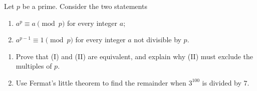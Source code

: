 Let $p$ be a prime. Consider the two statements
\begin{enumerate}
\item[(I)] $a^p\equiv a\pmod p$ for every integer $a$;
\item[(II)] $a^{p-1}\equiv1\pmod p$ for every integer $a$ not divisible by $p$.
\end{enumerate}
\begin{enumerate}
\item[(a)] Prove that (I) and (II) are equivalent, and explain why (II) must exclude the multiples of $p$.
\item[(b)] Use Fermat's little theorem to find the remainder when $3^{100}$ is divided by $7$.
\end{enumerate}
